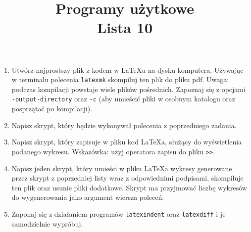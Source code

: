 \documentclass[12pt, letterpaper]{article}
\title{Programy użytkowe \\ Lista 10}
\date{}
\begin{document}
\maketitle
\begin{enumerate}
\item Utwórz najprostszy plik z kodem w \LaTeX{u} na dysku komputera. Używając w terminalu polecenia \verb|latexmk| skompiluj ten plik do pliku pdf. Uwaga: podczas kompilacji powstaje wiele plików pośrednich. Zapoznaj się z opcjami \verb|-output-directory| oraz \verb|-c| (aby umieścić pliki w osobnym katalogu oraz posprzątać po kompilacji).
\item Napisz skrypt, który będzie wykonywał polecenia z poprzedniego zadania.
\item Napisz skrypt, który zapisuje w pliku kod \LaTeX{a}, służący do wyświetlenia podanego wykresu. Wskazówka: użyj operatora zapisu do pliku \verb|>>|.
\item Napisz jeden skrypt, który umieści w pliku \LaTeX{a} wykresy generowane przez skrypt z poprzedniej listy wraz z odpowiednimi podpisami, skompiluje ten plik oraz usunie pliki dodatkowe. Skrypt ma przyjmować liczbę wykresów do wygenerowania jako argument wiersza poleceń.
\item Zaponaj się z działaniem programów \verb|latexindent| oraz \verb|latexdiff| i je samodzielnie wypróbuj.
\end{enumerate}
\end{document}
